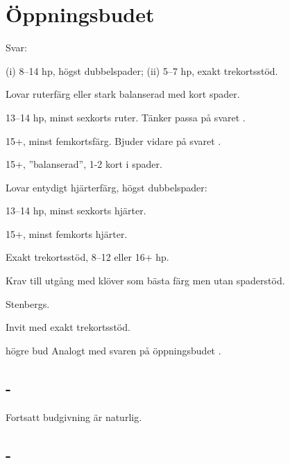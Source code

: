 \section{{\"O}ppningsbudet }

Svar:
\begin{beskriv}

   \item[\NT{1}] (i) 8--14 hp, h\"ogst dubbelspader; (ii) 5--7 hp, exakt
     trekortsstöd. 
   \item[\kl{2}] Lovar ruterf\"arg eller stark balanserad med kort spader.
         \begin{nummer}
           \item 13--14 hp, minst sexkorts ruter.
                 T{\"a}nker passa p{\aa} svaret .
           \item 15+, minst femkortsf{\"a}rg.
                      Bjuder vidare p{\aa} svaret .
	   \item 15+, ''balanserad'', 1-2 kort i spader.
          \end{nummer}

   \item[\ru{2}] Lovar entydigt hj\"arterf\"arg, högst dubbelspader:
          \begin{nummer}
            \item 13--14 hp, minst sexkorts hj{\"a}rter.
            \item 15+, minst femkorts hj{\"a}rter.
           \end{nummer}

   \item[\hj{2}] Exakt trekortsstöd, 8--12 eller 16+ hp. 

   \item[\spa{2}] Krav till utgång med klöver som bästa färg men utan
     spaderstöd. 

   \item[\NT{2}] Stenbergs.
   \item[\kl{3}] Invit med exakt trekortsstöd.
   \item[h\"ogre bud] Analogt med svaren p{\aa} \"oppningsbudet .
\end{beskriv}

\subsection{ - }

Fortsatt budgivning är naturlig.


\subsection{ - }

